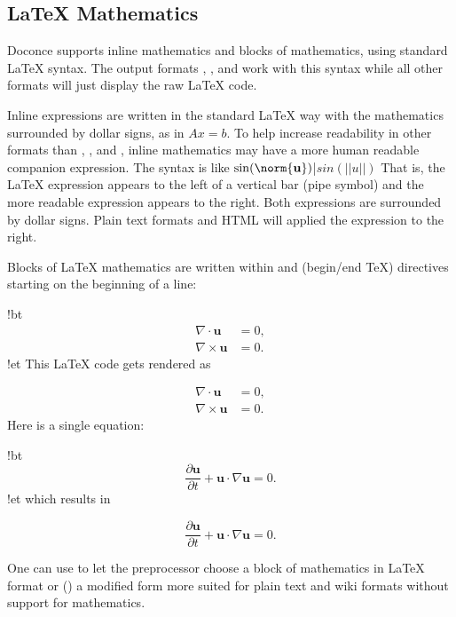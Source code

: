 \documentclass[%
oneside,                 %
final,                   %
chapterprefix=true,      %
open=right               %
10pt]{book}
\begin{document}
{\noindent

\subsection{{\LaTeX} Mathematics}

Doconce supports inline mathematics and blocks of mathematics, using
standard {\LaTeX} syntax. The output formats , , and 
work with this syntax while all other formats will just display the
raw {\LaTeX} code.

Inline expressions are written in the standard
{\LaTeX} way with the mathematics surrounded by dollar signs, as in
$Ax=b$. To help increase readability in other formats than ,
, and , inline mathematics may have a more human
readable companion expression. The syntax is like
\bccq
$\sin(\norm{\bf u})$|$sin(||u||)$
\eccq
That is, the {\LaTeX} expression appears to the left of a vertical bar (pipe
symbol) and the more readable expression appears to the right. Both
expressions are surrounded by dollar signs. Plain text formats and HTML
will applied the expression to the right.

Blocks of {\LaTeX} mathematics are written within
and
 (begin/end TeX) directives starting on the beginning of a line:

\bccq
!bt
\begin{align*}
\nabla\cdot \pmb{u} &= 0,\\
\nabla\times \pmb{u} &= 0.
\end{align*}
!et
\eccq
This {\LaTeX} code gets rendered as

\begin{align*}
\nabla\cdot \pmb{u} &= 0,\\
\nabla\times \pmb{u} &= 0.
\end{align*}
Here is a single equation:

\bccq
!bt
\[ \frac{\partial\pmb{u}}{\partial t} + \pmb{u}\cdot\nabla\pmb{u} = 0.\]
!et
\eccq
which results in

\[ \frac{\partial\pmb{u}}{\partial t} + \pmb{u}\cdot\nabla\pmb{u} = 0.\]

One can use  to let
the preprocessor choose a block of mathematics in {\LaTeX} format
or () a modified form more suited for plain text and wiki
formats without support for mathematics.

}
\end{document}
